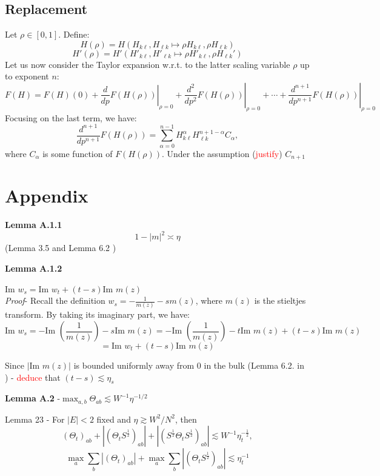 \documentclass[11pt]{article}
\newenvironment{boxt}[1]
  {\begin{mdframed}\noindent\textbf{#1}\normalfont\space}
  {\end{mdframed}}
\newcommand{\im}{\text{Im }}
\begin{document}
\subsection*{Replacement}
Let $\rho\in [0, 1]$. Define: $$H(\rho) = H(H_{k\ell}, H_{\ell k}\mapsto \rho H_{k\ell}, \rho H_{\ell k})$$
$$H'(\rho) = H'(H'_{k\ell}, H'_{\ell k}\mapsto \rho H'_{k\ell}, \rho H_{\ell k}')$$
Let us now consider the Taylor expansion w.r.t. to the latter scaling variable $\rho$ up to exponent $n$: 
$$F(H) = F(H)(0) + \left.\frac{d}{dp}F(H(\rho))\right\vert_{\rho=0}+\left.\frac{d^2}{dp^2}F(H(\rho))\right\vert_{\rho=0} + \cdots + \left.\frac{d^{n+1}}{dp^{n+1}}F(H(\rho))\right\vert_{\rho=0}$$
Focusing on the last term, we have: $$\frac{d^{n+1}}{dp^{n+1}}  F(H(\rho))= \sum_{\alpha=0}^{n-1}H_{k\ell}^\alpha H_{\ell k}^{n+1-\alpha}C_\alpha,$$
where $C_\alpha$ is some function of $F(H(\rho))$. Under the assumption (\textcolor{red}{justify}) $C_{n+1}$

\newpage
\section{Appendix}
\label{sec:appendix}

\begin{boxt}{Lemma A.1.1} \label{lemma-a11} $$ 1-|m|^2 \asymp \eta$$ (Lemma 3.5 \cite{21} and Lemma 6.2 \cite{dynamic})

\end{boxt}

\begin{boxt}{Lemma A.1.2} \label{lemma-a12} 

$ \im w_s = \im w_t + (t-s)\im m(z)$ \\
\textit{Proof}- Recall the definition $w_s = -\frac{1}{m(z)} - sm(z)$, where $m(z)$ is the stieltjes transform. By taking its imaginary part, we have: $$\im w_s = -\im \left( \frac{1}{m(z)}\right)-s\im m(z)= -\im \left( \frac{1}{m(z)}\right)-t\im m(z) + (t-s)\im m(z)$$
$$=\im w_t + (t-s)\im m(z)$$
\end{boxt}
Since $|\im m(z)|$ is bounded uniformly away from $0$ in the bulk (Lemma 6.2. in \cite{dynamic}) - \textcolor{red}{deduce} that $(t-s)\lesssim \eta_s $

\begin{boxt}{Lemma A.2} \label{lemma-a2} -$\max_{a,b}\Theta_{ab} \lesssim W^{-1}\eta^{-1/2}$

 Lemma 23 \cite{bandSDE} - For $|E|<2$ fixed and $\eta\gtrsim W^2/N^2$, then $$(\Theta_t)_{ab} + |(\Theta_tS^{\frac{1}{2}})_{ab}| + |\left(S^{\frac{1}{2}}\Theta_t S^{\frac{1}{2}}\right)_{ab}|\lesssim W^{-1}\eta_t^{-\frac{1}{2}}, $$
 $$\max_a \sum_b |(\Theta_t)_{ab}|+\max_a \sum_b |(\Theta_tS^{\frac{1}{2}})_{ab}|\lesssim \eta_t^{-1}$$
\end{boxt}
\end{document}
